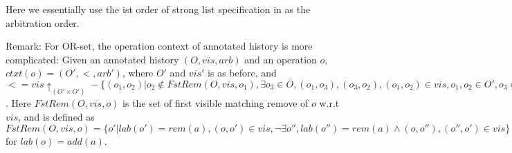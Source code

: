 
Here we essentially use the ist order of strong list specification in \cite{Attiya:2016} as the arbitration order.

{\color {red}Remark: For OR-set, the operation context of annotated history is more complicated: Given an annotated history $(O,\mathit{vis},\mathit{arb})$ and an operation $o$, $ctxt(o)=(O',<,\mathit{arb}')$, where $O'$ and $\mathit{vis}'$ is as before, and $< = \mathit{vis} \uparrow_{(O' \times O')} - \{ (o_1,o_2) \vert o_2 \notin FstRem(O,\mathit{vis},o_1), \exists o_3 \in O, (o_1,o_3), (o_3,o_2),(o_1,o_2) \in \mathit{vis}, o_1,o_2 \in O', o_3 \notin O' \}$. Here $FstRem(O,\mathit{vis},o)$ is the set of first visible matching remove of $o$ w.r.t $\mathit{vis}$, and is defined as $FstRem(O,\mathit{vis},o) = \{o' \vert lab(o')=rem(a), (o,o') \in \mathit{vis}, \neg \exists o'',  lab(o'') = rem(a)  \wedge (o,o''),(o'',o') \in \mathit{vis} \}$ for $lab(o) = add(a)$.} 








